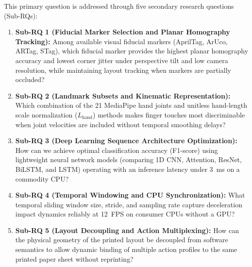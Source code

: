 This primary question is addressed through five secondary research questions (Sub-RQs):
\begin{enumerate}
    \item \textbf{Sub-RQ 1 (Fiducial Marker Selection and Planar Homography Tracking):} Among available visual fiducial markers (AprilTag, ArUco, ARTag, STag), which fiducial marker provides the highest planar homography accuracy and lowest corner jitter under perspective tilt and low camera resolution, while maintaining layout tracking when markers are partially occluded?
    \item \textbf{Sub-RQ 2 (Landmark Subsets and Kinematic Representation):} Which combination of the 21 MediaPipe hand joints and unitless hand-length scale normalization ($L_{\text{hand}}$) methods makes finger touches most discriminable when joint velocities are included without temporal smoothing delays?
    \item \textbf{Sub-RQ 3 (Deep Learning Sequence Architecture Optimization):} How can we achieve optimal classification accuracy (F1-score) using lightweight neural network models (comparing 1D CNN, Attention, ResNet, BiLSTM, and LSTM) operating with an inference latency under 3~ms on a commodity CPU?
    \item \textbf{Sub-RQ 4 (Temporal Windowing and CPU Synchronization):} What temporal sliding window size, stride, and sampling rate capture deceleration impact dynamics reliably at 12~FPS on consumer CPUs without a GPU?
    \item \textbf{Sub-RQ 5 (Layout Decoupling and Action Multiplexing):} How can the physical geometry of the printed layout be decoupled from software semantics to allow dynamic binding of multiple action profiles to the same printed paper sheet without reprinting?
\end{enumerate}

